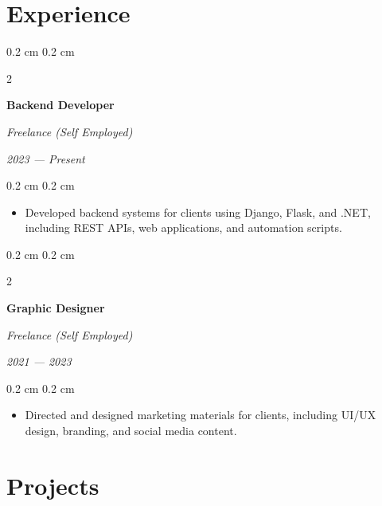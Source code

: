 \documentclass[10pt, a4paper]{article}
\newenvironment{highlights}{
    \begin{itemize}[
        topsep=0.1 cm,
        parsep=0.1 cm,
        partopsep=0pt,
        itemsep=0pt,
        leftmargin=0.4 cm + 10pt
    ]
}{
    \end{itemize}
} %
\newenvironment{onecolentry}{
    \begin{adjustwidth}{
        0.2 cm
    }{
        0.2 cm
    }
}{
    \end{adjustwidth}
} %
\newenvironment{twocolentry}[2][]{
    \onecolentry
    \def\secondColumn{#2}
    \begin{paracol}{2}
}{
    \switchcolumn \raggedleft \secondColumn
    \end{paracol}
    \endonecolentry
} %
\newcommand{\createpointblock}[5]{
    \begin{twocolentry}{
        \textit{#2}

        \textit{#4}}
        \textbf{#1}

        \textit{#3}
    \end{twocolentry}

    \vspace{0.1 cm}
    \begin{onecolentry}
        \begin{highlights}
            #5
        \end{highlights}
    \end{onecolentry}
}
\begin{document}


\section{Experience}

\createpointblock{Backend Developer}{2023 — Present}{Freelance (Self Employed)}{}
{%
    \item Developed backend systems for clients using Django, Flask, and .NET, including REST APIs, web applications, and automation scripts.
}

\vspace{0.2 cm}

\createpointblock{Graphic Designer}{2021 — 2023}{Freelance (Self Employed)}{}
{%
    \item Directed and designed marketing materials for clients, including UI/UX design, branding, and social media content.
}

\section{Projects}
\end{document}
